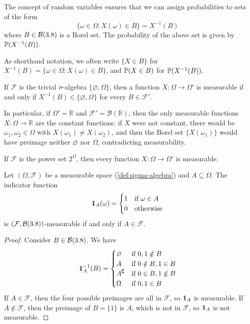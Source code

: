The concept of random variables ensures that we can assign probabilities to sets of the form
\[
\{\omega \in \Omega : X(\omega) \in B\} = X^{-1}(B)
\]
where $B \in \mathcal{B}(3.8)$ is a Borel set.
The probability of the above set is given by 
$\mathbb{P}(X^{-1}(B))$.
\begin{notation}
As shorthand notation, we often write 
$\{X \in B\}$ for $X^{-1}(B) = \{\omega \in \Omega : X(\omega) \allowbreak \in \allowbreak B\}$, and 
$\mathbb{P}(X \in B)$ for $\mathbb{P}(X^{-1}(B))$.
\end{notation}

\begin{example}
If $\mathcal{F}$ is the trivial $\sigma$-algebra $\{\varnothing, \Omega\}$, then a function
$X : \Omega \to \Omega'$ is measurable if and only if
\(
X^{-1}(B)\in\{\varnothing,\Omega\}
\)
for every $B\in\mathcal{F}'$.

In particular, if $\Omega'=\mathbb{R}$ and $\mathcal{F}'=\mathcal{B}(\mathbb{R})$, then the only measurable functions $X:\Omega\to\mathbb{R}$ are the constant functions:
if $X$ were not constant, there would be $\omega_1,\omega_2\in\Omega$ with $X(\omega_1)\neq X(\omega_2)$, and then the Borel set $\{X(\omega_1)\}$ would have preimage neither $\varnothing$ nor $\Omega$, contradicting measurability.

If $\mathcal{F}$ is the power set $2^\Omega$, then every function $X : \Omega \to \Omega'$ is measurable.
\end{example}

\begin{theorem}\label{thm:indicator-function-measurable}
Let $(\Omega,\mathcal{F})$ be a measurable space (\autoref{def:sigma-algebra}) and $A \subseteq \Omega$.
The indicator function
\[
\mathbf{1}_A(\omega)
=
\begin{cases}
1 & \text{if } \omega \in A \\
0 & \text{otherwise}
\end{cases}
\]
is $(\mathcal{F}, \mathcal{B}(3.8))$-measurable if and only if $A \in \mathcal{F}$.
\end{theorem}
\begin{proof}
Consider $B \in \mathcal{B}(3.8)$. 
We have
\[
\mathbf{1}_A^{-1}(B)
=
\begin{cases}
\varnothing & \text{if } 0,1 \notin B \\
A & \text{if } 0 \notin B, 1 \in B \\
A^{\complement} & \text{if } 0 \in B, 1 \notin B \\
\Omega & \text{if } 0,1 \in B
\end{cases}
\]
If $A \in \mathcal{F}$, then the four possible preimages are all in $\mathcal{F}$, so $\mathbf{1}_A$ is measurable.
If $A \notin \mathcal{F}$, then the preimage of $B = \{1\}$ is $A$, which is not in $\mathcal{F}$, so $\mathbf{1}_A$ is not measurable.
\end{proof}

